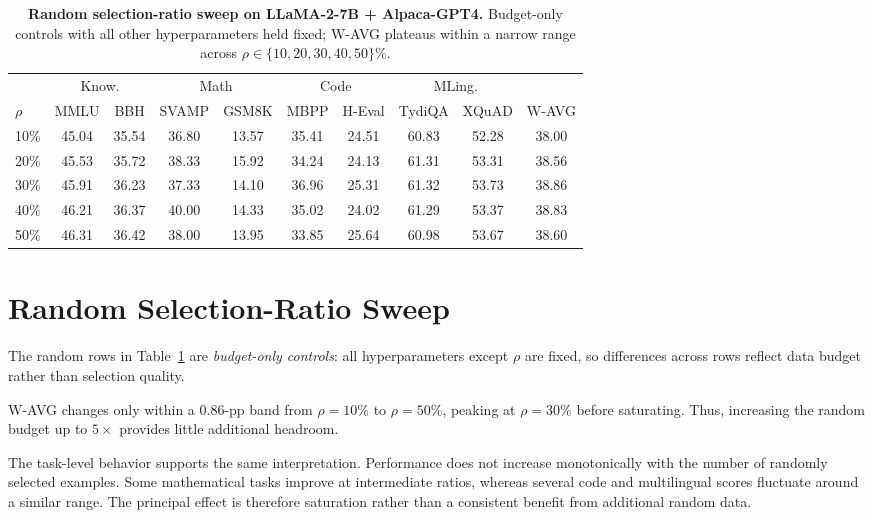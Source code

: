 \begin{table}[t]
\centering
\caption{\textbf{Random selection-ratio sweep on LLaMA-2-7B +
Alpaca-GPT4.} Budget-only controls with all other hyperparameters
held fixed; W-AVG plateaus within a narrow range across
\(\rho\in\{10,20,30,40,50\}\%\).}
\label{tab:ratio-sweep}
{\fontsize{7.5pt}{9pt}\selectfont
\setlength{\tabcolsep}{1.8pt}
\renewcommand{\arraystretch}{1.05}
\begin{tabular}{@{}lcccccccc c@{}}
\toprule
& \multicolumn{2}{c}{Know.} & \multicolumn{2}{c}{Math}
& \multicolumn{2}{c}{Code} & \multicolumn{2}{c}{MLing.} & \\
\cmidrule(lr){2-3}
\cmidrule(lr){4-5}
\cmidrule(lr){6-7}
\cmidrule(lr){8-9}
$\rho$ & MMLU & BBH & SVAMP & GSM8K & MBPP & H-Eval & TydiQA & XQuAD & W-AVG \\
\midrule
10\% & 45.04 & 35.54 & 36.80 & 13.57 & 35.41 & 24.51 & 60.83 & 52.28 & 38.00 \\
20\% & 45.53 & 35.72 & 38.33 & 15.92 & 34.24 & 24.13 & 61.31 & 53.31 & 38.56 \\
30\% & 45.91 & 36.23 & 37.33 & 14.10 & 36.96 & 25.31 & 61.32 & 53.73 & 38.86 \\
40\% & 46.21 & 36.37 & 40.00 & 14.33 & 35.02 & 24.02 & 61.29 & 53.37 & 38.83 \\
50\% & 46.31 & 36.42 & 38.00 & 13.95 & 33.85 & 25.64 & 60.98 & 53.67 & 38.60 \\
\bottomrule
\end{tabular}
}
\end{table}


\section{Random Selection-Ratio Sweep}
\label{app:ratio-sweep}

The random rows in Table~\ref{tab:ratio-sweep} are
\emph{budget-only controls}: all hyperparameters except \(\rho\) are
fixed, so differences across rows reflect data budget rather than
selection quality.

W-AVG changes only within a \(0.86\)-pp band from \(\rho=10\%\) to
\(\rho=50\%\), peaking at \(\rho=30\%\) before saturating. Thus,
increasing the random budget up to \(5\times\) provides little
additional headroom.

The task-level behavior supports the same interpretation. Performance
does not increase monotonically with the number of randomly selected
examples. Some mathematical tasks improve at intermediate ratios,
whereas several code and multilingual scores fluctuate around a
similar range. The principal effect is therefore saturation rather
than a consistent benefit from additional random data.

